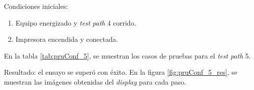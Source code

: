 Condiciones iniciales: 

\begin{enumerate}
	\item Equipo energizado y \textit{test path} 4 corrido.
	\item Impresora encendida y conectada.
\end{enumerate}

En la tabla \ref{tab:pruConf_5}, se muestran los casos de pruebas para el \textit{test path} 5.

\begin{table}[htpb]
\centering
\caption[Prueba de la etapa de configuración: \textit{test path} 5]{Casos de pruebas para el \textit{test path} 5.}
\label{tab:pruConf_5}
\end{table}

Resultado: el ensayo se superó con éxito. En la figura \ref{fig:pruConf_5_res}, se muestran las imágenes obtenidas del \textit{display} para cada paso.

